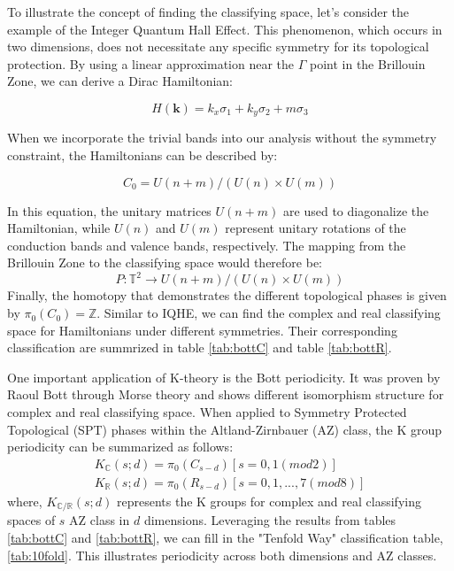 To illustrate the concept of finding the classifying space, let's consider the example of the Integer Quantum Hall Effect. This phenomenon, which occurs in two dimensions, does not necessitate any specific symmetry for its topological protection. By using a linear approximation near the $\Gamma$ point in the Brillouin Zone, we can derive a Dirac Hamiltonian:

\begin{equation}
H(\mathbf{k}) = k_x\sigma_1+k_y\sigma_2+m\sigma_3
\end{equation}

When we incorporate the trivial bands into our analysis without the symmetry constraint, the Hamiltonians can be described by:

\begin{equation}
C_0 = U(n+m)/(U(n)\times U(m))
\end{equation}

In this equation, the unitary matrices $U(n+m)$ are used to diagonalize the Hamiltonian, while $U(n)$ and $U(m)$ represent unitary rotations of the conduction bands and valence bands, respectively. The mapping from the Brillouin Zone to the classifying space would therefore be:
\begin{equation}
P:\mathbb{T}^2\rightarrow U(n+m)/(U(n)\times U(m))
\end{equation}
Finally, the homotopy that demonstrates the different topological phases is given by $\pi_0(C_0) = \mathbb{Z}$. Similar to IQHE, we can find the complex and real classifying space for Hamiltonians under different symmetries. Their corresponding classification are summrized in table \ref{tab:bottC} and table \ref{tab:bottR}.

One important application of K-theory is the Bott periodicity. It was proven by Raoul Bott through Morse theory and shows different isomorphism structure for complex and real classifying space\cite{bott1956application}. When applied to Symmetry Protected Topological (SPT) phases within the Altland-Zirnbauer (AZ) class, the K group periodicity can be summarized as follows:
\begin{align}
K_{\mathbb{C}}(s;d) = \pi_0(C_{s-d}) [s=0,1 (mod 2)]\\
K_{\mathbb{R}}(s;d) = \pi_0(R_{s-d}) [s=0,1,...,7 (mod 8)]
\end{align}
where, $K_{\mathbb{C}/\mathbb{R}}(s;d)$ represents the K groups for complex and real classifying spaces of $s$ AZ class in $d$ dimensions. Leveraging the results from tables \ref{tab:bottC} and \ref{tab:bottR}, we can fill in the "Tenfold Way" classification table, \ref{tab:10fold}. This illustrates periodicity across both dimensions and AZ classes.

